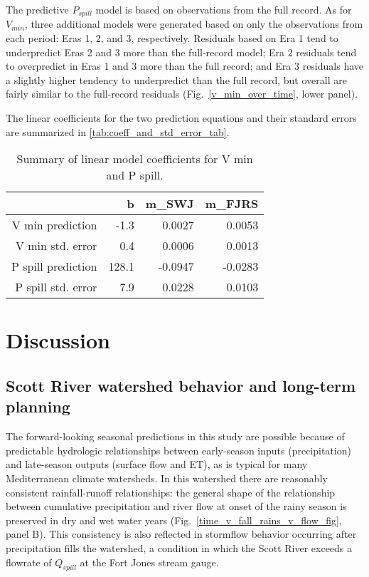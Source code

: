 \documentclass[hess, manuscript]{copernicus}
\begin{document}
The predictive $P_{spill}$ model is based on observations from the
full record. As for $V_{min}$, three additional models were generated
based on only the observations from each period: Eras 1, 2, and 3,
respectively. Residuals based on Era 1 tend to underpredict Eras 2 and 3
more than the full-record model; Era 2 residuals tend to overpredict in
Eras 1 and 3 more than the full record; and Era 3 residuals have a
slightly higher tendency to underpredict than the full record, but
overall are fairly similar to the full-record residuals
(Fig.~\ref{v_min_over_time}, lower panel).

The linear coefficients for the two prediction equations and their
standard errors are summarized in \autoref{tab:coeff_and_std_error_tab}.

\begin{table}[ht]
\centering
\caption{Summary of linear model coefficients for V min and P spill.} 
\label{tab:coeff_and_std_error_tab}
\begin{tabular}{rrrr}
  \hline
 & b & m\_SWJ & m\_FJRS \\ 
  \hline
V min prediction & -1.3 & 0.0027 & 0.0053 \\ 
  V min std. error & 0.4 & 0.0006 & 0.0013 \\ 
  P spill prediction & 128.1 & -0.0947 & -0.0283 \\ 
  P spill std. error & 7.9 & 0.0228 & 0.0103 \\ 
   \hline
\end{tabular}
\end{table}

\section{Discussion}

\subsection{Scott River watershed behavior and long-term planning}

The forward-looking seasonal predictions in this study are possible
because of predictable hydrologic relationships between early-season
inputs (precipitation) and late-season outputs (surface flow and ET), as
is typical for many Mediterranean climate watersheds. In this watershed
there are reasonably consistent rainfall-runoff relationships: the
general shape of the relationship between cumulative precipitation and
river flow at onset of the rainy season is preserved in dry and wet
water years (Fig.~\ref{time_v_fall_rains_v_flow_fig}, panel B). This
consistency is also reflected in stormflow behavior occurring after
precipitation fills the watershed, a condition in which the Scott River
exceeds a flowrate of $Q_{spill}$ at the Fort Jones stream gauge.
\end{document}
